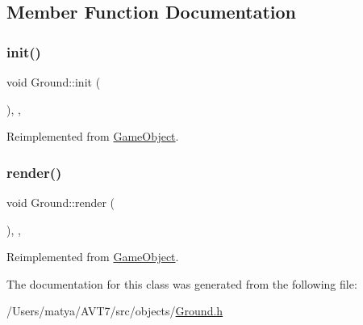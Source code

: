\subsection{Member Function Documentation}
\mbox{\label{class_ground_a4680c2a6ab91627a71939a5a942409ac}} 
\subsubsection{\texorpdfstring{init()}{init()}}
{\footnotesize\ttfamily void Ground\+::init (\begin{DoxyParamCaption}{ }\end{DoxyParamCaption})\hspace{0.3cm}{\ttfamily [inline]}, {\ttfamily [override]}, {\ttfamily [virtual]}}



Reimplemented from \hyperlink{class_game_object_aecb2c1b9f69715d854f7604d5d7978ec}{Game\+Object}.

\mbox{\label{class_ground_a558a7774ca17a4fb4455a0e0d9f66a94}} 
\subsubsection{\texorpdfstring{render()}{render()}}
{\footnotesize\ttfamily void Ground\+::render (\begin{DoxyParamCaption}{ }\end{DoxyParamCaption})\hspace{0.3cm}{\ttfamily [inline]}, {\ttfamily [override]}, {\ttfamily [virtual]}}



Reimplemented from \hyperlink{class_game_object_a484efb66a7a27c101e84c11d9905d7a6}{Game\+Object}.



The documentation for this class was generated from the following file\+:\begin{DoxyCompactItemize}
\item 
/\+Users/matya/\+A\+V\+T7/src/objects/\hyperlink{_ground_8h}{Ground.\+h}\end{DoxyCompactItemize}
